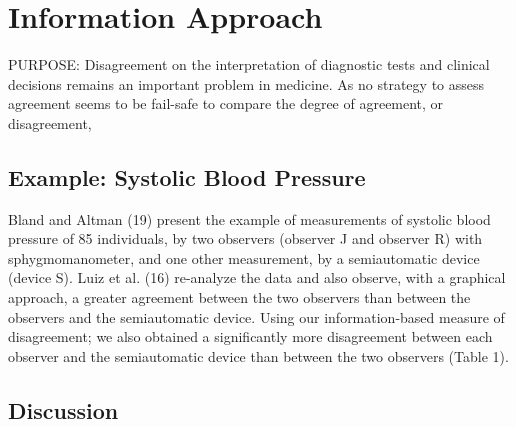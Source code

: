 \documentclass[Chap3bmain.tex]{subfiles}
\begin{document}
\section{Information Approach}

PURPOSE: Disagreement on the interpretation of diagnostic tests and clinical decisions 
remains an important problem in medicine. As no strategy to assess agreement seems to be 
fail-safe to compare the degree of agreement, or disagreement, 



\subsection{Example: Systolic Blood Pressure}
Bland and Altman (19) present the example of measurements of systolic blood pressure of 85 individuals, by two observers (observer J and observer R) with sphygmomanometer, and one other measurement, by a semiautomatic device (device S). Luiz et al. (16) re-analyze the data and also observe, with a graphical approach, a greater agreement between the two observers than between the observers and the semiautomatic device. Using our information-based measure of disagreement; we also obtained a significantly more
disagreement between each observer and the semiautomatic device than between the two observers (Table 1).


\subsection{Discussion}
\end{document}
